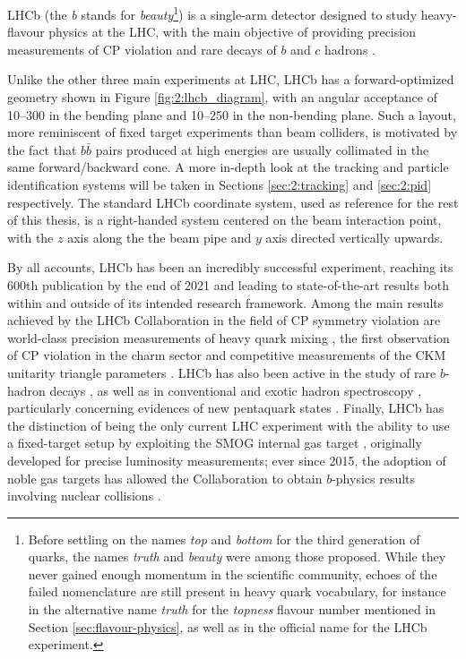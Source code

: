 LHCb (the \textit{b} stands for \textit{beauty}\footnote{Before settling on the names \textit{top} and \textit{bottom} for the third generation of quarks, the names \textit{truth} and \textit{beauty} were among those proposed. While they never gained enough momentum in the scientific community, echoes of the failed nomenclature are still present in heavy quark vocabulary, for instance in the alternative name \textit{truth} for the \textit{topness} flavour number mentioned in Section \ref{sec:flavour-physics}, as well as in the official name for the LHCb experiment.}) is a single-arm detector designed to study heavy-flavour physics at the LHC, with the main objective of providing precision measurements of CP violation and rare decays of $b$ and $c$ hadrons \cite{Alves:1129809}.

Unlike the other three main experiments at LHC, LHCb has a forward-optimized geometry shown in Figure \ref{fig:2:lhcb_diagram}, with an angular acceptance of 10--300 \si{\mrad} in the bending plane and 10--250 \si{\mrad} in the non-bending plane.
Such a layout, more reminiscent of fixed target experiments than beam colliders, is motivated by the fact that $b\bar{b}$ pairs produced at high energies are usually collimated in the same forward/backward cone.
A more in-depth look at the tracking and particle identification systems will be taken in Sections \ref{sec:2:tracking} and \ref{sec:2:pid} respectively.
\label{info:LHCb_system}
The standard LHCb coordinate system, used as reference for the rest of this thesis, is a right-handed system centered on the beam interaction point, with the $z$ axis along the the beam pipe and $y$ axis directed vertically upwards.

By all accounts, LHCb has been an incredibly successful experiment, reaching its 600th publication by the end of 2021 and leading to state-of-the-art results both within and outside of its intended research framework.
Among the main results achieved by the LHCb Collaboration in the field of CP symmetry violation are world-class precision measurements of heavy quark mixing \cite{B0MeasurementPrecise2016} \cite{B0MeasurementPrecise2013}, the first observation of CP violation in the charm sector \cite{PhysRevLett.122.211803} and competitive measurements of the CKM unitarity triangle parameters \cite{LHCb-CONF-2020-003}.
LHCb has also been active in the study of rare $b$-hadron decays \cite{PhysRevLett.118.191801}, as well as in conventional and exotic hadron spectroscopy \cite{DMesonSpectroscopy}, particularly concerning evidences of new pentaquark states \cite{LHCbPentaquark}.
Finally, LHCb has the distinction of being the only current LHC experiment with the ability to use a fixed-target setup by exploiting the SMOG internal gas target \cite{maurice2017fixedtarget}, originally developed for precise luminosity measurements;
ever since 2015, the adoption of noble gas targets has allowed the Collaboration to obtain $b$-physics results involving nuclear collisions \cite{PhysRevLett.122.132002}.



